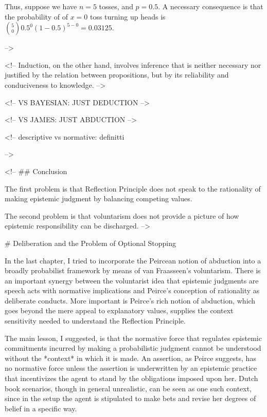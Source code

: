 Thus, suppose we have \(n=5\) tosses, and \(p=0.5\). A necessary
consequence is that the probability of of \(x = 0\) toss turning up
heads is \({5 \choose 0} 0.5^0 (1-0.5)^{5-0} = 0.03125\).

--\textgreater{}

\textless{}!-- Induction, on the other hand, involves inference that is
neither necessary nor justified by the relation between propositions,
but by its reliability and conduciveness to knowledge. --\textgreater{}

\textless{}!-- VS BAYESIAN: JUST DEDUCTION --\textgreater{}

\textless{}!-- VS JAMES: JUST ABDUCTION --\textgreater{}

\textless{}!-- descriptive vs normative: definitti

--\textgreater{}

\textless{}!-- \#\# Conclusion

The first problem is that Reflection Principle does not speak to the
rationality of making epistemic judgment by balancing competing values.

The second problem is that voluntarism does not provide a picture of how
epistemic responsibility can be discharged. --\textgreater{}

\# Deliberation and the Problem of Optional Stopping

In the last chapter, I tried to incorporate the Peircean notion of
abduction into a broadly probabilist framework by means of van
Fraasseen's voluntarism. There is an important synergy between the
voluntarist idea that epistemic judgments are speech acts with normative
implications and Peirce's conception of rationality as deliberate
conducts. More important is Peirce's rich notion of abduction, which
goes beyond the mere appeal to explanatory values, supplies the context
sensitivity needed to understand the Reflection Principle.

The main lesson, I suggested, is that the normative force that regulates
epistemic commitments incurred by making a probabilistic judgment cannot
be understood without the *context* in which it is made. An assertion,
as Peirce suggests, has no normative force unless the assertion is
underwritten by an epistemic practice that incentivizes the agent to
stand by the obligations imposed upon her. Dutch book scenarios, though
in general unrealistic, can be seen as one such context, since in the
setup the agent is stipulated to make bets and revise her degrees of
belief in a specific way.

